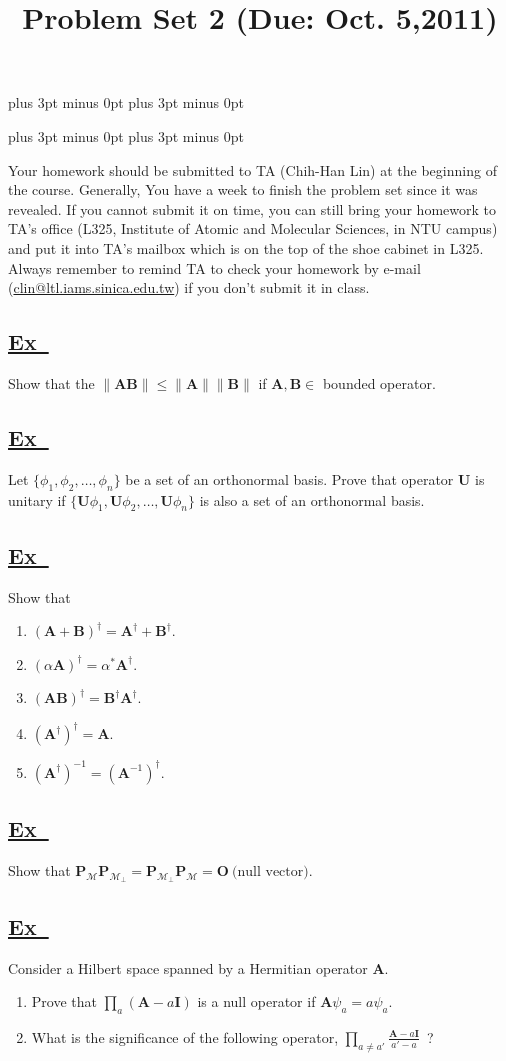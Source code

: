 \documentclass[a4paper,12pt]{article}
\newcommand{\excercise}{\addtocounter{section}{+1}
\subsection*{\underline{Ex~\thesection}}}
\newcommand{\norm}[1]{\|#1\|}
\begin{document}
\abovedisplayskip=-6pt plus 3pt minus 0pt
\belowdisplayskip=8pt plus 3pt minus 0pt

\abovedisplayshortskip=-6pt plus 3pt minus 0pt
\belowdisplayshortskip=8pt plus 3pt minus 0pt

\title{Problem Set 2 (Due: Oct. 5,2011)}
\maketitle

Your homework should be submitted to TA (Chih-Han Lin) at the  beginning of the course. Generally, You have a week to finish the problem set since it was revealed. If you cannot submit it on time, you can still bring your homework to TA's office (L325, Institute of Atomic and Molecular Sciences, in NTU campus) and put it into TA's mailbox which is on the top of the shoe cabinet in L325. Always remember to remind TA to check your homework by e-mail (\url{clin@ltl.iams.sinica.edu.tw}) if you don't submit it in class.

%

\excercise
Show that the $\norm{\mathbf{A}\mathbf{B}}\leqslant \norm{\mathbf{A}}\norm{\mathbf{B}}$ if $ \mathbf{A},\mathbf{B}\in$ bounded operator.

\excercise

Let $ \{\phi_1,\phi_2,\ldots ,\phi_n \}$ be a set of an orthonormal basis. Prove that operator $ \mathbf{U} $ is unitary
if $ \{ \mathbf{U}\phi_1,\mathbf{U}\phi_2,\ldots ,\mathbf{U}\phi_n \}$ is also a set of an orthonormal basis.


\excercise

Show that

\begin{enumerate}
\item $(\mathbf{A}+\mathbf{B})^\dag=\mathbf{A}^\dag+\mathbf{B}^\dag.$
\item $(\alpha\mathbf{A})^\dag=\alpha^*\mathbf{A}^\dag.$
\item $(\mathbf{AB})^\dag=\mathbf{B}^\dag\mathbf{A}^\dag.$
\item $(\mathbf{A}^\dag)^\dag=\mathbf{A}.$
\item $(\mathbf{A}^\dag)^{-1}=(\mathbf{A}^{-1})^\dag.$

\end{enumerate}

\excercise

Show that $\mathbf{P}_\mathcal{M}\mathbf{P}_{\mathcal{M}_\perp}=\mathbf{P}_{\mathcal{M}_\perp}\mathbf{P}_\mathcal{M}=\mathbf{O}~\mbox{(null vector)}.$

\excercise
Consider a Hilbert space spanned by a Hermitian operator  $ \mathbf{A} $. 
\begin{enumerate}
\item Prove that $ \displaystyle\prod_a(\mathbf{A}-a\mathbf{I}) $ is a null operator if $ \mathbf{A}\psi_a=a\psi_a $.
\item What is the significance of the following operator, $ \displaystyle\prod_{a\neq a'}\frac{\mathbf{A}-a\mathbf{I}}{a'-a} $~?
\end{enumerate}
\end{document}
